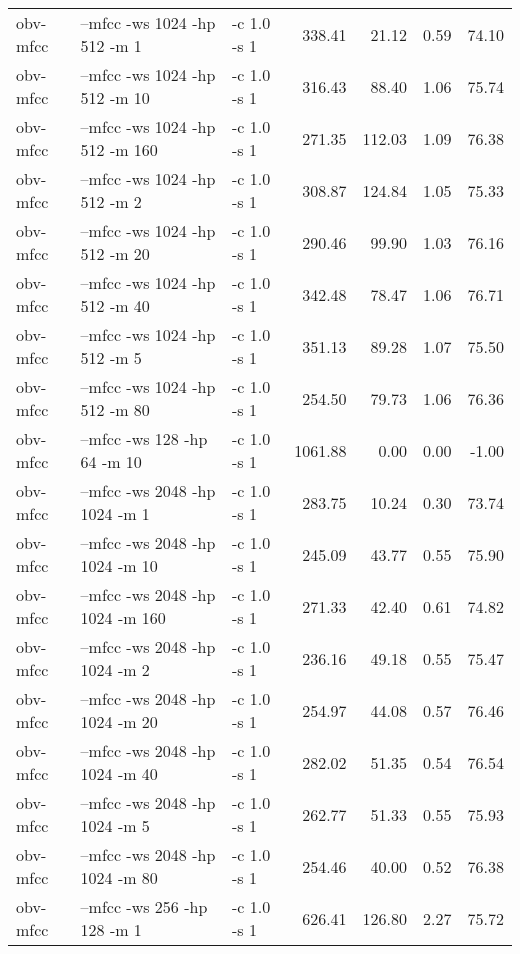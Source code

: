 \documentclass[11pt,a4paper]{article}
\begin{document}
\begin{tabular}{lllrrrr}
 obv-mfcc  &  --mfcc -ws 1024 -hp 512  -m 1    &  -c 1.0 -s 1  &   338.41  &   21.12  &  0.59  &  74.10  \\
 obv-mfcc  &  --mfcc -ws 1024 -hp 512  -m 10   &  -c 1.0 -s 1  &   316.43  &   88.40  &  1.06  &  75.74  \\
 obv-mfcc  &  --mfcc -ws 1024 -hp 512  -m 160  &  -c 1.0 -s 1  &   271.35  &  112.03  &  1.09  &  76.38  \\
 obv-mfcc  &  --mfcc -ws 1024 -hp 512  -m 2    &  -c 1.0 -s 1  &   308.87  &  124.84  &  1.05  &  75.33  \\
 obv-mfcc  &  --mfcc -ws 1024 -hp 512  -m 20   &  -c 1.0 -s 1  &   290.46  &   99.90  &  1.03  &  76.16  \\
 obv-mfcc  &  --mfcc -ws 1024 -hp 512  -m 40   &  -c 1.0 -s 1  &   342.48  &   78.47  &  1.06  &  76.71  \\
 obv-mfcc  &  --mfcc -ws 1024 -hp 512  -m 5    &  -c 1.0 -s 1  &   351.13  &   89.28  &  1.07  &  75.50  \\
 obv-mfcc  &  --mfcc -ws 1024 -hp 512  -m 80   &  -c 1.0 -s 1  &   254.50  &   79.73  &  1.06  &  76.36  \\
 obv-mfcc  &  --mfcc -ws 128  -hp 64   -m 10   &  -c 1.0 -s 1  &  1061.88  &    0.00  &  0.00  &  -1.00  \\
 obv-mfcc  &  --mfcc -ws 2048 -hp 1024 -m 1    &  -c 1.0 -s 1  &   283.75  &   10.24  &  0.30  &  73.74  \\
 obv-mfcc  &  --mfcc -ws 2048 -hp 1024 -m 10   &  -c 1.0 -s 1  &   245.09  &   43.77  &  0.55  &  75.90  \\
 obv-mfcc  &  --mfcc -ws 2048 -hp 1024 -m 160  &  -c 1.0 -s 1  &   271.33  &   42.40  &  0.61  &  74.82  \\
 obv-mfcc  &  --mfcc -ws 2048 -hp 1024 -m 2    &  -c 1.0 -s 1  &   236.16  &   49.18  &  0.55  &  75.47  \\
 obv-mfcc  &  --mfcc -ws 2048 -hp 1024 -m 20   &  -c 1.0 -s 1  &   254.97  &   44.08  &  0.57  &  76.46  \\
 obv-mfcc  &  --mfcc -ws 2048 -hp 1024 -m 40   &  -c 1.0 -s 1  &   282.02  &   51.35  &  0.54  &  76.54  \\
 obv-mfcc  &  --mfcc -ws 2048 -hp 1024 -m 5    &  -c 1.0 -s 1  &   262.77  &   51.33  &  0.55  &  75.93  \\
 obv-mfcc  &  --mfcc -ws 2048 -hp 1024 -m 80   &  -c 1.0 -s 1  &   254.46  &   40.00  &  0.52  &  76.38  \\
 obv-mfcc  &  --mfcc -ws 256  -hp 128  -m 1    &  -c 1.0 -s 1  &   626.41  &  126.80  &  2.27  &  75.72  \\

\end{tabular}
\end{document}
